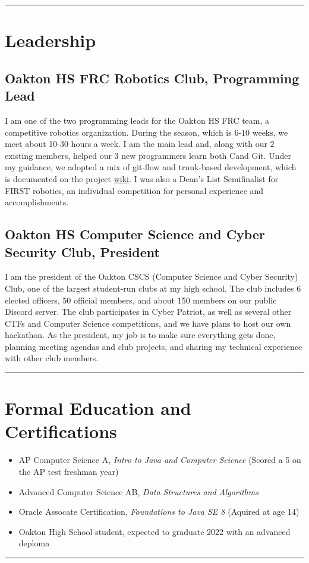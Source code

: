 \documentclass[10pt,letterpaper]{article}
\def\link#1#2{\color{blue!60!black}\href{#1}{#2}\color{black}}
\newcommand{\CPP}
{C\nolinebreak[4]\hspace{-.05em}\raisebox{.35ex}{\footnotesize\bf ++}}
\def\paddedItem#1{\vspace{-0.4em}\item #1}
\begin{document}
    \hrule
    \vspace{-0.4em}

    \section*{Leadership}
    \subsection*{Oakton HS FRC Robotics Club, Programming Lead}

    I am one of the two programming leads for the Oakton HS FRC team,
    a competitive robotics organization.
    During the season, which is 6-10 weeks, we meet about 10-30 hours a week.
    I am the main lead and, along with our 2 existing members,
    helped our 3 new programmers learn both \CPP and Git.
    Under my guidance, we adopted a mix of git-flow and trunk-based development,
    which is documented on the project \link{https://github.com/CougarProgramming623/InfiniteRecharge/wiki/Git}{wiki}.
    I was also a Dean's List Semifinalist for FIRST robotics,
    an individual competition for personal experience and accomplishments.

    \subsection*{Oakton HS Computer Science and Cyber Security Club, President}

    I am the president of the Oakton CSCS (Computer Science and Cyber Security) Club,
    one of the largest student-run clubs at my high school. 
    The club includes 6 elected officers, 50 official members, and about 150 members on our public Discord server.
    The club participates in Cyber Patriot, as well as several other CTFs and Computer Science competitions,
    and we have plans to host our own hackathon.
    As the president, my job is to make sure everything gets done, planning meeting agendas and club projects,
    and sharing my technical experience with other club members. 

    \vspace{1em}
    \hrule

    \section*{Formal Education and Certifications}
    \begin{itemize}
        \paddedItem AP Computer Science A, \textit{Intro to Java and Computer Science}  (Scored a 5 on the AP test freshman year)
        \paddedItem Advanced Computer Science AB, \textit{Data Structures and Algorithms}
        \paddedItem Oracle Assocate Certification, \textit{Foundations to Java SE 8} (Aquired at age 14)
        \paddedItem Oakton High School student, expected to graduate 2022 with an advanced deploma
    \end{itemize}
    \vspace{0.3em}
    \hrule
    
\end{document}
